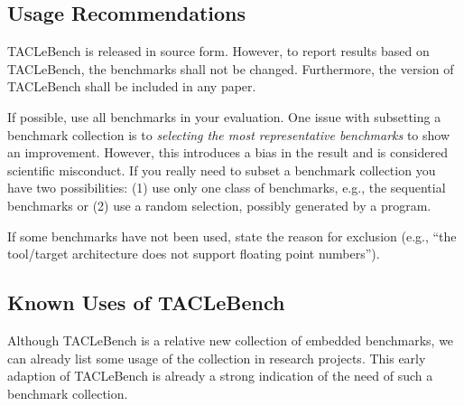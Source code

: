 \documentclass[a4paper,UKenglish]{oasics-v2016}
\newcommand{\todo}[1]{{\emph{TODO: #1}}}
\newcommand{\martin}[1]{{\color{blue} Martin: #1}}
\renewcommand{\todo}[1]{}
\renewcommand{\martin}[1]{}
\begin{document}
\subsection{Usage Recommendations}
\label{usage}

TACLeBench is released in source form. However, to report
results based on TACLeBench, the benchmarks shall not be changed.
Furthermore, the version of TACLeBench shall be included in any paper.

If possible, use all benchmarks in your evaluation. One issue with subsetting
a benchmark collection is to \emph{selecting the most representative benchmarks}
to show an improvement. However, this introduces a bias in the result and
is considered scientific misconduct. If you really need to subset a benchmark collection you have
two possibilities: (1) use only one class of benchmarks, e.g., the sequential
benchmarks or (2) use a random selection, possibly generated by a program.

If some benchmarks have not been used, state the reason for exclusion
(e.g., ``the tool/target architecture does not support floating point numbers'').
\martin{I would really like to aim for a benchmark collection that does not
need any changes! Better drop some.}


\subsection{Known Uses of TACLeBench}

Although TACLeBench is a relative new collection of embedded benchmarks,
we can already list some usage of the collection in research projects.
This early adaption of TACLeBench is already a strong indication of
the need of such a benchmark collection.

\martin{This section might go away, as we have not enough pace.
However, it is good to collect the information here. We might need it
for a future journal version.}

\todo{Refs are missing form some usage.}
\end{document}
